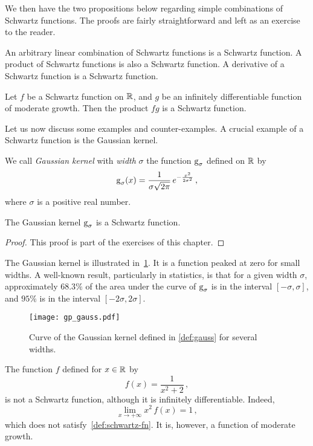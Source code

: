 We then have the two propositions below regarding simple combinations of Schwartz
functions. The proofs are fairly straightforward and left as an exercise to the reader.
\begin{proposition}
  \label{prop:schwartz-comb}
  An arbitrary linear combination of Schwartz functions is a Schwartz function. A product
  of Schwartz functions is also a Schwartz function. A derivative of a Schwartz function
  is a Schwartz function.
\end{proposition}
\begin{proposition}
  Let $f$ be a Schwartz function on $\mathbb{R}$, and $g$ be an infinitely differentiable function
  of moderate growth. Then the product $fg$ is a Schwartz function.
\end{proposition}
Let us now discuss some examples and counter-examples. A crucial example of a Schwartz
function is the Gaussian kernel.
\begin{definition}
  \label{def:gauss}
  We call \emph{Gaussian kernel} with \emph{width} $\sigma$ the function $\operatorname{g}_{\sigma}$
  defined on $\mathbb{R}$ by
  \begin{equation}
    \operatorname{g}_{\sigma}(x)=\frac{1}{\sigma\sqrt{2\pi}}\,e^{-\frac{x^2}{2\sigma^2}}\,,
  \end{equation}
  where $\sigma$ is a positive real number.
\end{definition}
\begin{proposition}
  \label{prop:gauss-schwartz}
  The Gaussian kernel $\operatorname{g}_{\sigma}$ is a Schwartz function.
\end{proposition}
\begin{proof}
  This proof is part of the exercises of this chapter.
\end{proof}
The Gaussian kernel is illustrated in~\cref{fig:gauss}. It is a function peaked at zero
for small widths. A well-known result, particularly in statistics, is that for a given
width $\sigma$, approximately $68.3\%$ of the area under the curve of $\operatorname{g}_{\sigma}$ is
in the interval $[-\sigma,\sigma]$, and $95\%$ is in the interval $[-2\sigma,2\sigma]$.
\begin{figure}[t]
  \centering
  \texttt{[image: gp\_gauss.pdf]}
  \caption{Curve of the Gaussian kernel defined in \cref{def:gauss} for several widths.}
  \label{fig:gauss}
\end{figure}
\begin{example}
  The function $f$ defined for $x\in\mathbb{R}$ by
  \begin{equation}
    f(x)=\frac{1}{x^2+2}\,,
  \end{equation}
  is not a Schwartz function, although it is infinitely differentiable. Indeed,
  \begin{equation}
    \lim_{x\to+\infty} x^2\,f(x)=1\,,
  \end{equation}
  which does not satisfy~\cref{def:schwartz-fn}. It is, however, a function of moderate
  growth.
\end{example}
